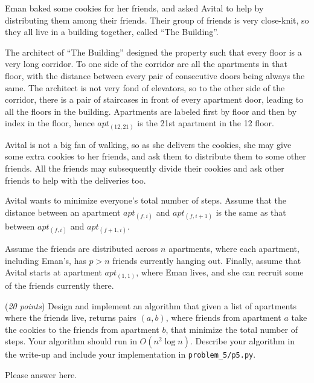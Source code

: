 \documentclass{hw}
\begin{document}
\begin{problem}
  Eman baked some cookies for her friends, and asked Avital to help
  by distributing them among their friends. 
  Their group of friends is very close-knit, so they all live in a building 
  together, called ``The Building''.
  
  The architect of ``The Building'' designed 
  the property such that every floor is a very long corridor. To one side of 
  the corridor are all the apartments in that floor, with the distance between 
  every pair of consecutive doors being always the same.   
  The architect is not very fond of elevators, so to the other side of the 
  corridor, there is a pair of staircases in front of every apartment door,
  leading to all the floors in the building. 
  Apartments are labeled first by floor and then by index in the floor, hence 
  $apt_{(12,21)}$ is the 21st apartment in the 12 floor.

  Avital is not a big fan of walking, so as she delivers the cookies,
  she may give some extra cookies to her friends, and ask them to
  distribute them to some other friends. All the friends may subsequently
  divide their cookies and ask other friends to help with the deliveries too. 
  
  Avital wants to minimize everyone's total number of steps. Assume that the distance between an apartment $apt_{(f,i)}$ and $apt_{(f,i+1)}$ is the same as that between $apt_{(f,i)}$ and $apt_{(f+1,i)}$. 
  
  Assume the friends are distributed across $n$ apartments,
  where each apartment, including Eman's, has $p > n$ friends
  currently hanging out.
  Finally, assume that Avital starts at apartment $apt_{(1,1)}$,
  where Eman lives, and she can recruit some of the friends currently there.

  (\textit{20 points}) Design and implement an algorithm that given a list of apartments where the friends live, returns pairs $(a, b)$, where friends from apartment $a$ take the cookies to the friends from apartment $b$, that minimize the total number of steps. Your algorithm should run in $O(n^2 \log n)$.
  Describe your algorithm in the write-up and include your implementation in \texttt{problem\_5/p5.py}.

\begin{solution}
Please answer here.
\end{solution}
\end{problem}
\end{document}
